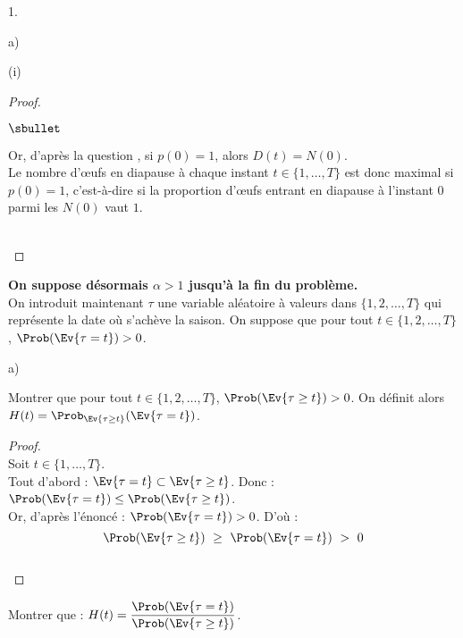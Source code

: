 \documentclass[11pt]{article}%
\begin{document}
\begin{noliste}{1.}
\begin{noliste}{a)}
\begin{nonoliste}{(i)}
\begin{proof}
\begin{noliste}{$\sbullet$}
	  \item Or, d'après la question , si $p(0)=1$, 
	  alors $D(t)=N(0)$.\\
	  Le nombre d'{\oe}ufs en diapause à chaque instant $t\in \{1, 
	  \ldots, T\}$ est donc maximal si $p(0)=1$, c'est-à-dire si la 
	  proportion d'{\oe}ufs entrant en diapause à l'instant $0$
	  parmi les $N(0)$ vaut $1$.
        \end{noliste}
        ~\\[-1cm]
      \end{proof}

    \end{nonoliste}
  \end{noliste}
  
  \item {\bf On suppose désormais $\alpha >1$ jusqu'à la fin du 
  problème.}\\
  On introduit maintenant $\tau$ une variable aléatoire à valeurs dans 
  $\{1,2, \ldots, T\}$ qui représente la date où s'achève la saison. On 
  suppose que pour tout $t \in \{1,2, \ldots, T\}$, $\Prob(
  \Ev{\tau=t}) >0$.
  \begin{noliste}{a)}
    \setlength{\itemsep}{2mm}
    \item Montrer que pour tout $t\in \{1,2, \ldots, T\}$, $\Prob(
    \Ev{\tau \geq t}) >0$. On définit alors $H(t)= \Prob_{\Ev{\tau \geq 
    t}}(\Ev{\tau =t})$.
    
    \begin{proof}~\\
      Soit $t\in \{1, \ldots, T\}$.\\
      Tout d'abord : $\Ev{\tau =t} \subset \Ev{\tau \geq t}$.
      Donc : $\Prob(\Ev{\tau = t}) \leq \Prob(\Ev{\tau \geq t})$.\\
      Or, d'après l'énoncé : $\Prob(\Ev{\tau =t}) >0$. D'où :
      \[
        \Prob(\Ev{\tau \geq t}) \ \geq \ \Prob(\Ev{\tau =t}) \ > \ 0
      \]
      ~\\[-1cm]
    \end{proof}

    
    \item Montrer que : $H(t)= \dfrac{\Prob(\Ev{\tau=t})}{\Prob(\Ev{\tau
    \geq t})}$.
    

\end{noliste}
\end{noliste}
\end{document}
